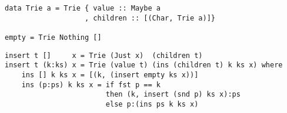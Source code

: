 \documentclass{article}
\begin{document}
\lstset{language=Haskell}
\begin{lstlisting}[caption=Definition of alphabetic trie]
data Trie a = Trie { value :: Maybe a
                   , children :: [(Char, Trie a)]}

empty = Trie Nothing []
\end{lstlisting}

\lstset{language=Haskell}
\begin{lstlisting}[caption=Insertion to aphabetic trie]
insert t []     x = Trie (Just x)  (children t)
insert t (k:ks) x = Trie (value t) (ins (children t) k ks x) where
    ins [] k ks x = [(k, (insert empty ks x))]
    ins (p:ps) k ks x = if fst p == k
                        then (k, insert (snd p) ks x):ps
                        else p:(ins ps k ks x)
\end{lstlisting}

\ifx\wholebook\relax \else
\end{document}
